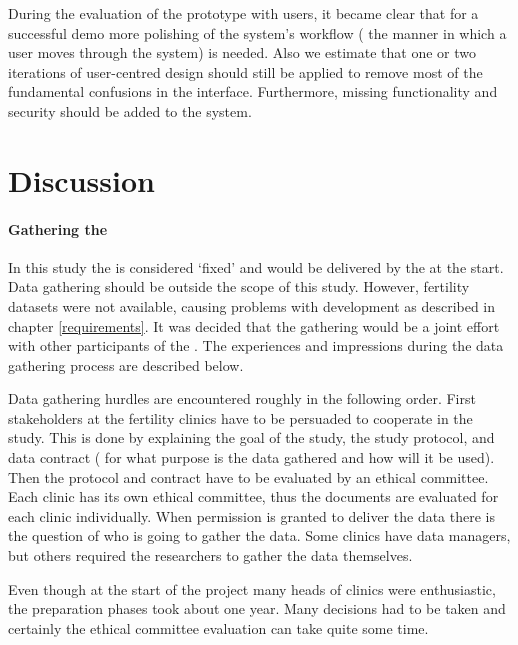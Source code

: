 During the evaluation of the prototype with users, it became clear that for a successful demo more polishing of the system's workflow (\ie{} the manner in which a user moves through the system) is needed.
Also we estimate that one or two iterations of user-centred design should still be applied to remove most of the fundamental confusions in the interface.
Furthermore, missing functionality and security should be added to the system.

\section{Discussion}

\paragraph{Gathering the \projectdata{}}

In this study the \projectdata{} is considered `fixed' and would be delivered by the \project{} at the start.
Data gathering should be outside the scope of this study.
However, fertility datasets were not available, causing problems with development as described in chapter \ref{requirements}.
It was decided that the gathering would be a joint effort with other participants of the \project{}.
The experiences and impressions during the data gathering process are described below.

Data gathering hurdles are encountered roughly in the following order.
First stakeholders at the fertility clinics have to be persuaded to cooperate in the study.
This is done by explaining the goal of the study, the study protocol, and data contract (\ie{} for what purpose is the data gathered and how will it be used).
Then the protocol and contract have to be evaluated by an ethical committee.
Each clinic has its own ethical committee, thus the documents are evaluated for each clinic individually.
When permission is granted to deliver the data there is the question of who is going to gather the data.
Some clinics have data managers, but others required the \project{} researchers to gather the data themselves.

Even though at the start of the project many heads of clinics were enthusiastic, the preparation phases took about one year.
Many decisions had to be taken and certainly the ethical committee evaluation can take quite some time. 

